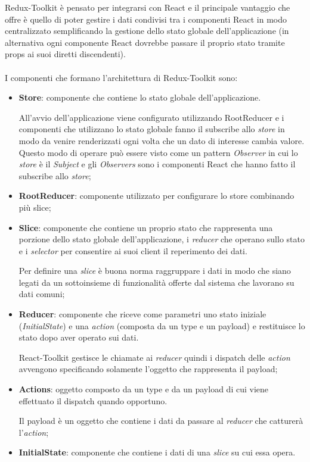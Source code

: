 Redux-Toolkit è pensato per integrarsi con React e il principale vantaggio che offre è quello di poter gestire i dati condivisi tra 
i componenti React in modo centralizzato semplificando la gestione dello stato globale dell'applicazione 
(in alternativa ogni componente React dovrebbe passare il proprio stato tramite props ai suoi diretti discendenti).
\\\\
I componenti che formano l'architettura di Redux-Toolkit sono:
\begin{itemize}
	\item \textbf{Store}: componente che contiene lo stato globale dell'applicazione.
	
	All'avvio dell'applicazione viene configurato utilizzando RootReducer e i componenti che utilizzano lo stato globale fanno il subscribe allo \textit{store}
	in modo da venire renderizzati ogni volta che un dato di interesse cambia valore.
	Questo modo di operare può essere visto come un pattern \textit{Observer} in cui lo \textit{store} è il \textit{Subject} e gli \textit{Observers} sono i componenti React che hanno fatto 
	il subscribe allo \textit{store};
	\item \textbf{RootReducer}: componente utilizzato per configurare lo store combinando più slice;
	\item \textbf{Slice}: componente che contiene un proprio stato che rappresenta una porzione dello stato globale dell'applicazione, i \textit{reducer}
	che operano sullo stato e i \textit{selector} per consentire ai suoi client il reperimento dei dati. 

	Per definire una \textit{slice} è buona norma raggruppare i dati in modo che siano legati da un sottoinsieme di funzionalità offerte dal sistema che lavorano 
	su dati comuni;  
	\item \textbf{Reducer}: componente che riceve come parametri uno stato iniziale (\textit{InitialState}) e una \textit{action} (composta da un type e un payload) e restituisce 
	lo stato dopo aver operato sui dati. 
	
	React-Toolkit gestisce le chiamate ai \textit{reducer} quindi i dispatch delle \textit{action} avvengono
	specificando solamente l'oggetto che rappresenta il payload; 
	\item \textbf{Actions}: oggetto composto da un type e da un payload di cui viene effettuato il dispatch quando opportuno. 
	
	Il payload è un oggetto che contiene i dati da passare al \textit{reducer} che catturerà l'\textit{action};
	\item \textbf{InitialState}: componente che contiene i dati di una \textit{slice} su cui essa opera. 
	

\end{itemize}
